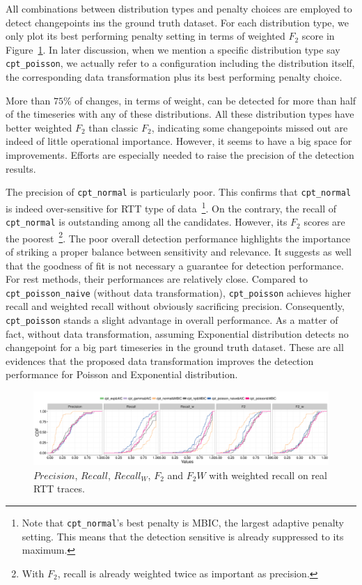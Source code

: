 All combinations between distribution types and penalty choices are employed to detect changepoints ins the ground truth dataset.
For each distribution type, we only plot its best performing penalty setting in terms of weighted $F_2$ score in Figure~\ref{fig:real_eval}.
In later discussion, when we mention a specific distribution type say \texttt{cpt\_poisson}, we actually refer to a configuration including the distribution itself, the corresponding data transformation plus its best performing penalty choice.

More than $75\%$ of changes, in terms of weight, can be detected for more than half of the timeseries with any of these distributions.
All these distribution types have better weighted $F_2$ than classic $F_2$, indicating some changepoints missed out are indeed of little operational importance.
However, it seems to have a big space for improvements.
Efforts are especially needed to raise the precision of the detection results.

The precision of \texttt{cpt\_normal} is particularly poor.
This confirms that \texttt{cpt\_normal} is indeed over-sensitive for RTT type of data~\footnote{Note that \texttt{cpt\_normal}'s best penalty is MBIC, the largest adaptive penalty setting. This means that the detection sensitive is already suppressed to its maximum.}.
On the contrary, the recall of \texttt{cpt\_normal} is outstanding among all the candidates.
However, its $F_2$ scores are the poorest~\footnote{With $F_2$, recall is already weighted twice as important as precision.}.
The poor overall detection performance highlights the importance of striking a proper balance between sensitivity and relevance.
It suggests as well that the goodness of fit is not necessary a guarantee for detection performance.
For rest methods, their performances are relatively close. 
Compared to \texttt{cpt\_poisson\_naive} (without data transformation), \texttt{cpt\_poisson} achieves higher recall and weighted recall without obviously sacrificing precision.
Consequently, \texttt{cpt\_poisson} stands a slight advantage in overall performance.
As a matter of fact, without data transformation, assuming Exponential distribution detects no changepoint for a big part timeseries in the ground truth dataset.
These are all evidences that the proposed data transformation improves the detection performance for Poisson and Exponential distribution.

\begin{landscape}
\begin{figure}[!ht]
\centering
\includegraphics[width=1.8\textwidth]{gfx/chap4/real_eval_bis.pdf}
\caption{$Precision$, $Recall$, $Recall_W$, $F_2$ and $F_2W$ with weighted recall on real RTT traces.}
\label{fig:real_eval}
\end{figure}
\end{landscape}

